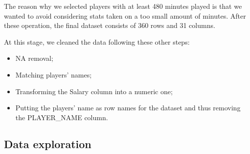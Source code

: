\documentclass[
]{article}
\newenvironment{Shaded}{\begin{snugshade}}{\end{snugshade}}
\newcommand{\AttributeTok}[1]{\textcolor[rgb]{0.77,0.63,0.00}{#1}}
\newcommand{\ConstantTok}[1]{\textcolor[rgb]{0.00,0.00,0.00}{#1}}
\newcommand{\DecValTok}[1]{\textcolor[rgb]{0.00,0.00,0.81}{#1}}
\newcommand{\FunctionTok}[1]{\textcolor[rgb]{0.00,0.00,0.00}{#1}}
\newcommand{\NormalTok}[1]{#1}
\newcommand{\OtherTok}[1]{\textcolor[rgb]{0.56,0.35,0.01}{#1}}
\newcommand{\SpecialCharTok}[1]{\textcolor[rgb]{0.00,0.00,0.00}{#1}}
\newcommand{\StringTok}[1]{\textcolor[rgb]{0.31,0.60,0.02}{#1}}
\providecommand{\tightlist}{%
  \setlength{\itemsep}{0pt}\setlength{\parskip}{0pt}}
\begin{document}
\begin{Shaded}
\end{Shaded}

The reason why we selected players with at least 480 minutes played is
that we wanted to avoid considering stats taken on a too small amount of
minutes. After these operation, the final dataset consists of 360 rows
and 31 columns.

At this stage, we cleaned the data following these other steps:

\begin{itemize}
\tightlist
\item
  NA removal;
\item
  Matching players' names;
\item
  Transforming the Salary column into a numeric one;
\item
  Putting the players' name as row names for the dataset and thus
  removing the PLAYER\_NAME column.
\end{itemize}

\hypertarget{data-exploration}{%
\subsection{Data exploration}\label{data-exploration}}
\end{document}

